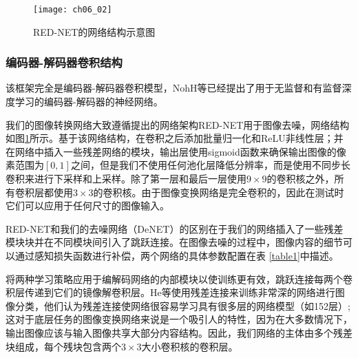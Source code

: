 \begin{figure}[t]
\centering
\texttt{[image: ch06\_02]}
\caption{ RED-NET的网络结构示意图}
\label{fig:ch06_02}
\vspace{-6mm}
\end{figure} 
\subsubsection{编码器-解码器卷积结构}

该框架完全是编码器-解码器卷积模型，NohH等\cite{NohH2015,hong2015decoupled,Long2017Fully,Dong2016,Mao2016}已经提出了用于无监督和有监督深度学习的编码器-解码器的神经网络。

我们的图像转换网络大致遵循\cite{Mao2016}提出的网络架构RED-NET用于图像去噪，网络结构如图\ref{fig:ch06_02}所示。基于该网络结构，在卷积之后添加批量归一化\cite{Ioffe2014Batch}和ReLU非线性层；并在网络中插入一些残差网络的模块\cite{he15}，输出层使用sigmoid函数来确保输出图像的像素范围为$[0,1]$之间，但是我们不使用任何池化层降低分辨率，而是使用不同步长卷积来进行下采样和上采样。除了第一层和最后一层使用$9\times 9$的卷积核之外，所有卷积层都使用$3 \times 3$的卷积核。由于图像变换网络是完全卷积的，因此在测试时它们可以应用于任何尺寸的图像输入。

RED-NET和我们的去噪网络（DeNET）的区别在于我们的网络插入了一些残差模块块并在不同模块间引入了跳跃连接。在图像去噪的过程中，图像内容的细节可以通过感知损失函数进行补偿，两个网络的具体参数配置在表 \ref{table1}中描述。

将两种学习策略应用于编解码网络的内部模块以使训练更有效，跳跃连接每两个卷积层传递到它们的镜像解卷积层。He等\cite{he15}使用残差连接来训练非常深的网络进行图像分类，他们认为残差连接使网络很容易学习具有很多层的网络模型（如152层）;这对于底层任务的图像变换网络来说是一个吸引人的特性，因为在大多数情况下，输出图像应该与输入图像共享大部分内容结构。因此，我们网络的主体由多个残差块组成，每个残块包含两个$ 3\times 3 $大小卷积核的卷积层。
 
